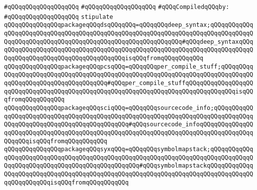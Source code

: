 \verb|#qQQqqQQqqQQqqQQqqQQq|\newline
\verb|#qQQqqQQqqQQqqQQqqQQq|\newline
\newline
\verb|#qQQqCompiledqQQqby:|\newline
\verb|#qQQqqQQqqQQqqQQqqQQq|\newline
\newline
\newline
\verb|stipulate|\newline
\verb|qQQqqQQqqQQqqQQqpackageqQQqdsqQQqqQQq=qQQqqQQqdeep_syntax;qQQqqQQqqQQqqQQqqQQqqQQqqQQqqQQqqQQqqQQqqQQqqQQqqQQqqQQqqQQqqQQqqQQqqQQqqQQqqQQqqQQqqQQqqQQqqQQqqQQqqQQqqQQqqQQqqQQqqQQqqQQqqQQqqQQq#qQQqdeep_syntaxqQQqqQQqqQQqqQQqqQQqqQQqqQQqqQQqqQQqqQQqqQQqqQQqqQQqqQQqqQQqqQQqqQQqqQQqqQQqqQQqqQQqqQQqqQQqqQQqqQQqqQQqqQQqisqQQqfromqQQqqQQqqQQq|\newline
\verb|qQQqqQQqqQQqqQQqpackageqQQqpcsqQQq=qQQqqQQqper_compile_stuff;qQQqqQQqqQQqqQQqqQQqqQQqqQQqqQQqqQQqqQQqqQQqqQQqqQQqqQQqqQQqqQQqqQQqqQQqqQQqqQQqqQQqqQQqqQQqqQQqqQQqqQQqqQQq#qQQqper_compile_stuffqQQqqQQqqQQqqQQqqQQqqQQqqQQqqQQqqQQqqQQqqQQqqQQqqQQqqQQqqQQqqQQqqQQqqQQqqQQqqQQqqQQqisqQQqfromqQQqqQQqqQQq|\newline
\verb|qQQqqQQqqQQqqQQqpackageqQQqsciqQQq=qQQqqQQqsourcecode_info;qQQqqQQqqQQqqQQqqQQqqQQqqQQqqQQqqQQqqQQqqQQqqQQqqQQqqQQqqQQqqQQqqQQqqQQqqQQqqQQqqQQqqQQqqQQqqQQqqQQqqQQqqQQqqQQqqQQq#qQQqsourcecode_infoqQQqqQQqqQQqqQQqqQQqqQQqqQQqqQQqqQQqqQQqqQQqqQQqqQQqqQQqqQQqqQQqqQQqqQQqqQQqqQQqqQQqqQQqqQQqisqQQqfromqQQqqQQqqQQq|\newline
\verb|qQQqqQQqqQQqqQQqpackageqQQqsyxqQQq=qQQqqQQqsymbolmapstack;qQQqqQQqqQQqqQQqqQQqqQQqqQQqqQQqqQQqqQQqqQQqqQQqqQQqqQQqqQQqqQQqqQQqqQQqqQQqqQQqqQQqqQQqqQQqqQQqqQQqqQQqqQQqqQQqqQQqqQQq#qQQqsymbolmapstackqQQqqQQqqQQqqQQqqQQqqQQqqQQqqQQqqQQqqQQqqQQqqQQqqQQqqQQqqQQqqQQqqQQqqQQqqQQqqQQqqQQqqQQqqQQqqQQqisqQQqfromqQQqqQQqqQQq|\newline
